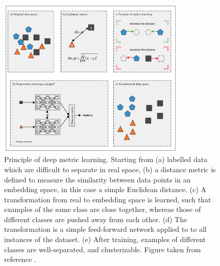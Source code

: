 \begin{figure}[h!]
    \centering
    \includegraphics[width=0.8\textwidth]{figures/metric-learning-illustration.png}
    \caption{Principle of deep metric learning. Starting from (a) labelled data which are difficult to separate in real space, (b) a distance metric is defined to measure the similarity between data points in an embedding space, in this case a simple Euclidean distance. (c) A transformation from real to embedding space is learned, such that examples of the same class are close together, whereas those of different classes are pushed away from each other. (d) The transformation is a simple feed-forward network applied to to all instances of the dataset. (e) After training, examples of different classes are well-separated, and clusterizable. Figure taken from reference \cite{metric-learning-rev2}.}
    \label{fig:metric-learning-illus}
\end{figure}

